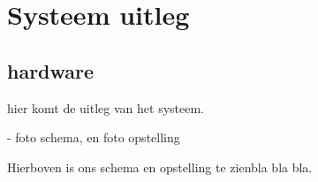 \section{Systeem uitleg}


\subsection{hardware}
hier komt de uitleg van het systeem.

- foto schema, en foto opstelling

Hierboven is ons schema en opstelling te zienbla bla bla. 



\subsection{}